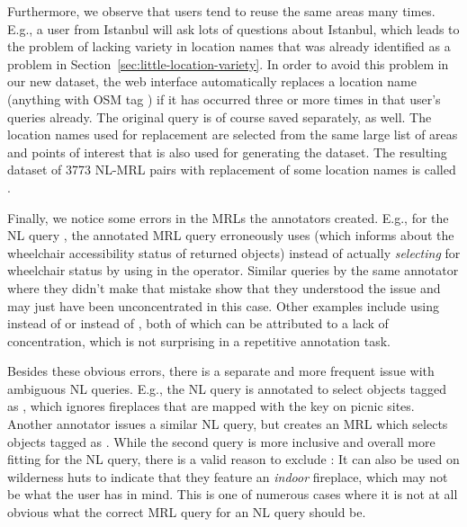Furthermore, we observe that users tend to reuse the same areas many times.
E.g., a user from Istanbul will ask lots of questions about Istanbul, which
leads to the problem of lacking variety in location names that was already
identified as a problem in Section~\ref{sec:little-location-variety}. In order
to avoid this problem in our new dataset, the web interface automatically
replaces a location name (anything with OSM tag ) if it has
occurred three or more times in that user’s queries already. The original query
is of course saved separately, as well. The location names used for replacement
are selected from the same large list of areas and points of interest that is
also used for generating the \nlmapsthree{} dataset. The resulting dataset of
\num{3773} NL-MRL pairs with replacement of some location names is called
\nlmapsfourraw{}.

Finally, we notice some errors in the MRLs the annotators created. E.g., for the
NL query , the annotated MRL query erroneously uses 
 (which informs about the wheelchair accessibility status of
returned objects) instead of actually \emph{selecting} for wheelchair status by
using   in the  operator.
Similar queries by the same annotator where they didn’t make that mistake show
that they understood the issue and may just have been unconcentrated in this
case. Other examples include using  instead of
 or  instead of ,
both of which can be attributed to a lack of concentration, which is not
surprising in a repetitive annotation task.

Besides these obvious errors, there is a separate and more frequent issue with
ambiguous NL queries. E.g., the NL query  is annotated to select objects tagged as
, which ignores fireplaces that are mapped with
the key  on picnic sites. Another annotator issues a
similar NL query, but creates an MRL which selects objects tagged as
  .
While the second query is more inclusive and overall more fitting for the NL
query, there is a valid reason to exclude : It can also be
used on wilderness huts to indicate that they feature an \emph{indoor}
fireplace, which may not be what the user has in mind. This is one of numerous
cases where it is not at all obvious what the correct MRL query for an NL query
should be.

